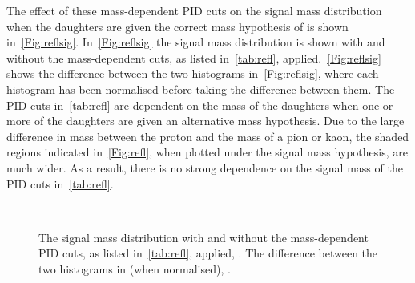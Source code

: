 The effect of these mass-dependent PID cuts on the signal mass distribution when the daughters are given the correct mass hypothesis of \proton\pim\mumu is shown in~\autoref{Fig:reflsig}. In~\autoref{Fig:reflsig}\protect{} the signal mass distribution is shown with and without the mass-dependent cuts, as listed in~\autoref{tab:refl}, applied.~\autoref{Fig:reflsig}\protect{} shows the difference between the two histograms in~\autoref{Fig:reflsig}\protect{}, where each histogram has been normalised before taking the difference between them. The PID cuts in~\autoref{tab:refl} are dependent on the mass of the daughters when one or more of the daughters are given an alternative mass hypothesis. Due to the large difference in mass between the proton and the mass of a pion or kaon, the shaded regions indicated in~\autoref{Fig:refl}\protect{}, when plotted under the signal mass hypothesis, are much wider. As a result, there is no strong dependence on the signal mass of the PID cuts in~\autoref{tab:refl}. 
\begin{figure}[h!]
  \def\nh{0.7\textwidth}
  \centering
    \textwidth\\
  \textwidth
  \caption{The signal mass distribution with and without the mass-dependent PID cuts, as listed in~\autoref{tab:refl}\protect{}, applied, \protect{}. The difference between the two histograms in \protect{} (when normalised), \protect{}.} 
  \label{Fig:reflsig}
\end{figure}

